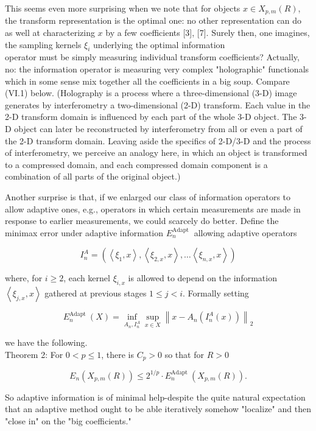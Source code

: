 \documentclass[10pt]{article}
\begin{document}
This seems even more surprising when we note that for objects $x \in X_{p, m}(R)$, the transform representation is the optimal one: no other representation can do as well at characterizing $x$ by a few coefficients [3], [7]. Surely then, one imagines, the sampling kernels $\xi_{i}$ underlying the optimal information\\
operator must be simply measuring individual transform coefficients? Actually, no: the information operator is measuring very complex "holographic" functionals which in some sense mix together all the coefficients in a big soup. Compare (VI.1) below. (Holography is a process where a three-dimensional (3-D) image generates by interferometry a two-dimensional (2-D) transform. Each value in the 2-D transform domain is influenced by each part of the whole 3-D object. The 3-D object can later be reconstructed by interferometry from all or even a part of the 2-D transform domain. Leaving aside the specifics of 2-D/3-D and the process of interferometry, we perceive an analogy here, in which an object is transformed to a compressed domain, and each compressed domain component is a combination of all parts of the original object.)

Another surprise is that, if we enlarged our class of information operators to allow adaptive ones, e.g., operators in which certain measurements are made in response to earlier measurements, we could scarcely do better. Define the minimax error under adaptive information $E_{n}^{\text {Adapt }}$ allowing adaptive operators

$$
I_{n}^{A}=\left(\left\langle\xi_{1}, x\right\rangle,\left\langle\xi_{2, x}, x\right\rangle, \ldots\left\langle\xi_{n, x}, x\right\rangle\right)
$$

where, for $i \geq 2$, each kernel $\xi_{i, x}$ is allowed to depend on the information $\left\langle\xi_{j, x}, x\right\rangle$ gathered at previous stages $1 \leq j<i$. Formally setting

$$
E_{n}^{\text {Adapt }}(X)=\inf _{A_{n}, I_{n}^{A}} \sup _{x \in X}\left\|x-A_{n}\left(I_{n}^{A}(x)\right)\right\|_{2}
$$

we have the following.\\
Theorem 2: For $0<p \leq 1$, there is $C_{p}>0$ so that for $R>0$

$$
E_{n}\left(X_{p, m}(R)\right) \leq 2^{1 / p} \cdot E_{n}^{\text {Adapt }}\left(X_{p, m}(R)\right) .
$$

So adaptive information is of minimal help-despite the quite natural expectation that an adaptive method ought to be able iteratively somehow "localize" and then "close in" on the "big coefficients."
\end{document}
